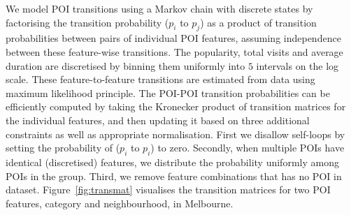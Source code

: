 We model POI transitions using a Markov chain with discrete 
states by factorising the transition probability ($p_i$ to $p_j$) 
as a product of transition probabilities between pairs of individual POI features, 
assuming independence between these feature-wise transitions.
The popularity, total visits and average duration are discretised by binning
them uniformly into $5$ intervals on the log scale.
These feature-to-feature transitions are estimated from data using maximum likelihood principle.
The POI-POI transition probabilities can be efficiently computed by taking the Kronecker product of 
transition matrices for the individual features,
and then updating it based on three additional constraints as well as appropriate normalisation.
First we disallow self-loops by setting the probability of ($p_i$ to $p_i$) to zero.
Secondly, when multiple POIs have identical (discretised) features, we distribute the probability uniformly among POIs in the group.
Third, we remove feature combinations that has no POI in dataset. 
Figure~\ref{fig:transmat} visualises the transition matrices for two POI features, category and neighbourhood, in Melbourne.

